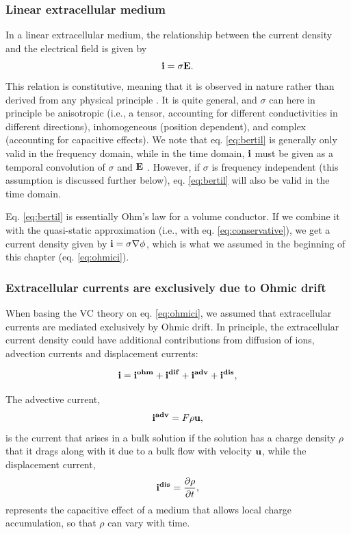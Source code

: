 \subsubsection{Linear extracellular medium} 
In a linear extracellular medium, the relationship between the current density and the electrical field is given by
\begin{equation}
{\bf i} = \sigma {\bf E}.
\label{eq:bertil}
\end{equation}
This relation is constitutive, meaning that it is observed in nature rather than derived from any physical principle \citep{Nunez2006, Pettersen2012}. It is quite general, and $\sigma$ can here in principle be anisotropic (i.e., a tensor, accounting for different conductivities in different directions), inhomogeneous (position dependent), and complex (accounting for capacitive effects). We note that eq. \ref{eq:bertil} is generally only valid in the frequency domain, while in the time domain, ${\bf i}$ must be given as a temporal convolution of $\sigma$ and ${\bf E}$ \cite{Bedard2009}. However, if $\sigma$ is frequency independent (this assumption is discussed further below), eq. \ref{eq:bertil} will also be valid in the time domain.

Eq. \ref{eq:bertil} is essentially Ohm's law for a volume conductor. If we combine it with 
the quasi-static approximation (i.e., with eq. \ref{eq:conservative}), we get a current density given by ${\bf i} = \sigma \nabla \phi$, which is what we assumed in the beginning of this chapter (eq. \ref{eq:ohmici}).


\subsubsection{Extracellular currents are exclusively due to Ohmic drift} 
\label{sec:onlyohmic}
When basing the VC theory on eq. \ref{eq:ohmici}, we assumed that extracellular currents are mediated exclusively by Ohmic drift. In principle, the extracellular current density could have additional contributions from diffusion of ions, advection currents and displacement currents:

\begin{equation}
{\bf i} = {\bf i^{ohm}} + {\bf i^{dif}} + {\bf i^{adv}} + {\bf i^{dis}}, 
\label{eq:generalcurrent}
\end{equation}

The advective current, 
\begin{equation}
{\bf i^{adv}} = F \rho {\bf u}, 
\label{eq:iadv}
\end{equation}
is the current that arises in a bulk solution if the solution has a charge density $\rho$ that it drags along with it due to a bulk flow with velocity ${\bf u}$, while the displacement current,
\begin{equation}
{\bf i^{dis}} = \frac{\partial \rho}{\partial t},
\label{eq:idis}
\end{equation}
represents the capacitive effect of a medium that allows local charge accumulation, so that $\rho$ can vary with time.  

